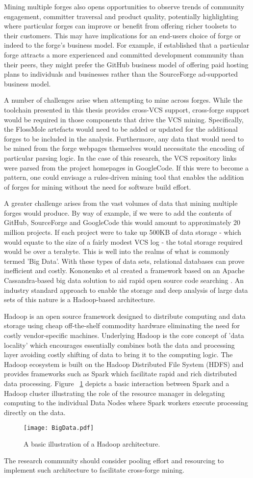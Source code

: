 Mining multiple forges also opens opportunities to observe trends of community engagement, committer traversal and product quality, potentially highlighting where particular forges can improve or benefit from offering richer toolsets to their customers. This may have implications for an end-users choice of forge or indeed to the forge's business model. For example, if established that a particular forge attracts a more experienced and committed development community than their peers, they might prefer the GitHub business model of offering paid hosting plans to individuals and businesses rather than the SourceForge ad-supported business model.

A number of challenges arise when attempting to mine across forges. While the toolchain presented in this thesis provides cross-VCS support, cross-forge support would be required in those components that drive the VCS mining. Specifically, the FlossMole artefacts would need to be added or updated for the additional forges to be included in the analysis. Furthermore, any data that would need to be mined from the forge webpages themselves would necessitate the encoding of particular parsing logic. In the case of this research, the VCS repository links were parsed from the project homepages in GoogleCode. If this were to become a pattern, one could envisage a rules-driven mining tool that enables the addition of forges for mining without the need for software build effort.

A greater challenge arises from the vast volumes of data that mining multiple forges would produce. By way of example, if we were to add the contents of GitHub, SourceForge and GoogleCode this would amount to approximately 20 million projects. If each project were to take up 500KB of data storage - which would equate to the size of a fairly modest VCS log - the total storage required would be over a terabyte. This is well into the realms of what is commonly termed 'Big Data'. With these types of data sets, relational databases can prove inefficient and costly. Kononenko et al created a framework based on an Apache Cassandra-based big data solution to aid rapid open source code searching \citep{kononenko2014mining}. An industry standard approach to enable the storage and deep analysis of large data sets of this nature is a Hadoop-based architecture. 

Hadoop is an open source framework designed to distribute computing and data storage using cheap off-the-shelf commodity hardware eliminating the need for costly vendor-specific machines. Underlying Hadoop is the core concept of 'data locality' which encourages essentially combines both the data and processing layer avoiding costly shifting of data to bring it to the computing logic. The Hadoop ecosystem is built on the Hadoop Distributed File System (HDFS) and provides frameworks such as Spark which facilitate rapid and rich distributed data processing. Figure ~\ref{fig:BigData} depicts a basic interaction between Spark and a Hadoop cluster illustrating the role of the resource manager in delegating computing to the individual Data Nodes where Spark workers execute processing directly on the data.

\begin{figure}[htbp!] 
\centering    
\texttt{[image: BigData.pdf]}
\caption{A basic illustration of a Hadoop architecture.}
\label{fig:BigData}
\end{figure}

The research community should consider pooling effort and resourcing to implement such architecture to facilitate cross-forge mining.
